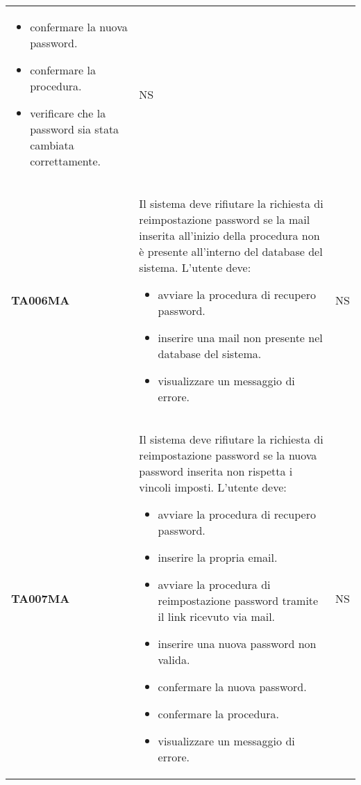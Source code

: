 \documentclass[../../piano-di-qualifica.tex]{subfiles}
\begin{document}
\begin{longtable}[H]{>{\centering\bfseries}m{3cm} >{}m{10cm} >{\centering\arraybackslash}m{3cm}}
\begin{itemize}
    \item confermare la nuova password.
    \item confermare la procedura.
    \item verificare che la password sia stata cambiata correttamente.
  \end{itemize}
                    & NS                                                                                                                                                                                                                                                               \\
  TA006MA           & Il sistema deve rifiutare la richiesta di reimpostazione password se la mail inserita all'inizio della procedura non è presente all'interno del database del sistema. \newline
  L'utente deve:
  \begin{itemize}
    \item avviare la procedura di recupero password.
    \item inserire una mail non presente nel database del sistema.
    \item visualizzare un messaggio di errore.
  \end{itemize}
                    & NS                                                                                                                                                                                                                                                               \\
  TA007MA           & Il sistema deve rifiutare la richiesta di reimpostazione password se la nuova password inserita non rispetta i vincoli imposti. \newline
  L'utente deve:
  \begin{itemize}
    \item avviare la procedura di recupero password.
    \item inserire la propria email.
    \item avviare la procedura di reimpostazione password tramite il link ricevuto via mail.
    \item inserire una nuova password non valida.
    \item confermare la nuova password.
    \item confermare la procedura.
    \item visualizzare un messaggio di errore.
  \end{itemize}
                    & NS                                                                                                                                                                                                                                                               \\

\end{longtable}
\end{document}
